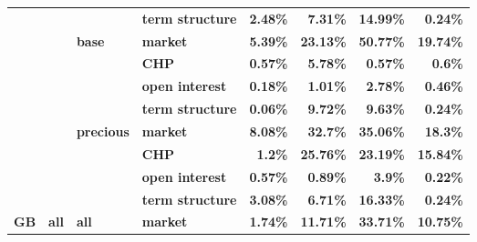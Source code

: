 \documentclass[
  authoryear,
  preprint,
  3p]{elsarticle}
\begin{document}
\begin{longtable}[t]{>{}l>{}l>{}l>{}l>{}r>{}r>{}r>{}r}
\textbf{} & \textbf{} & \textbf{} & \textbf{term structure} & \textcolor[HTML]{4285f4}{\textbf{2.48\%}} & \textcolor[HTML]{4285f4}{\textbf{7.31\%}} & \textcolor[HTML]{4285f4}{\textbf{14.99\%}} & \textcolor[HTML]{4285f4}{\textbf{0.24\%}}\\
\addlinespace
\textbf{} & \textbf{} & \textbf{base} & \textbf{market} & \textcolor[HTML]{4285f4}{\textbf{5.39\%}} & \textcolor[HTML]{4285f4}{\textbf{23.13\%}} & \textcolor[HTML]{4285f4}{\textbf{50.77\%}} & \textcolor[HTML]{4285f4}{\textbf{19.74\%}}\\
\textbf{} & \textbf{} & \textbf{} & \textbf{CHP} & \textcolor[HTML]{4285f4}{\textbf{0.57\%}} & \textcolor[HTML]{4285f4}{\textbf{5.78\%}} & \textcolor[HTML]{4285f4}{\textbf{0.57\%}} & \textcolor[HTML]{4285f4}{\textbf{0.6\%}}\\
\textbf{} & \textbf{} & \textbf{} & \textbf{open interest} & \textcolor[HTML]{4285f4}{\textbf{0.18\%}} & \textcolor[HTML]{4285f4}{\textbf{1.01\%}} & \textcolor[HTML]{4285f4}{\textbf{2.78\%}} & \textcolor[HTML]{4285f4}{\textbf{0.46\%}}\\
\textbf{} & \textbf{} & \textbf{} & \textbf{term structure} & \textcolor[HTML]{4285f4}{\textbf{0.06\%}} & \textcolor[HTML]{4285f4}{\textbf{9.72\%}} & \textcolor[HTML]{4285f4}{\textbf{9.63\%}} & \textcolor[HTML]{4285f4}{\textbf{0.24\%}}\\
\textbf{} & \textbf{} & \textbf{precious} & \textbf{market} & \textcolor[HTML]{4285f4}{\textbf{8.08\%}} & \textcolor[HTML]{4285f4}{\textbf{32.7\%}} & \textcolor[HTML]{4285f4}{\textbf{35.06\%}} & \textcolor[HTML]{4285f4}{\textbf{18.3\%}}\\
\addlinespace
\textbf{} & \textbf{} & \textbf{} & \textbf{CHP} & \textcolor[HTML]{4285f4}{\textbf{1.2\%}} & \textcolor[HTML]{4285f4}{\textbf{25.76\%}} & \textcolor[HTML]{4285f4}{\textbf{23.19\%}} & \textcolor[HTML]{4285f4}{\textbf{15.84\%}}\\
\textbf{} & \textbf{} & \textbf{} & \textbf{open interest} & \textcolor[HTML]{4285f4}{\textbf{0.57\%}} & \textcolor[HTML]{4285f4}{\textbf{0.89\%}} & \textcolor[HTML]{4285f4}{\textbf{3.9\%}} & \textcolor[HTML]{4285f4}{\textbf{0.22\%}}\\
\textbf{} & \textbf{} & \textbf{} & \textbf{term structure} & \textcolor[HTML]{4285f4}{\textbf{3.08\%}} & \textcolor[HTML]{4285f4}{\textbf{6.71\%}} & \textcolor[HTML]{4285f4}{\textbf{16.33\%}} & \textcolor[HTML]{4285f4}{\textbf{0.24\%}}\\
\textbf{GB} & \textbf{all} & \textbf{all} & \textbf{market} & \textcolor[HTML]{4285f4}{\textbf{1.74\%}} & \textcolor[HTML]{4285f4}{\textbf{11.71\%}} & \textcolor[HTML]{4285f4}{\textbf{33.71\%}} & \textcolor[HTML]{4285f4}{\textbf{10.75\%}}\\

\end{longtable}
\end{document}
